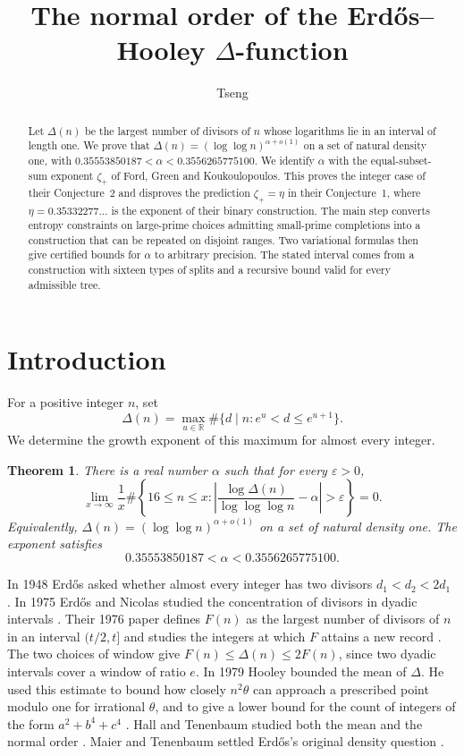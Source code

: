 \documentclass[11pt]{article}
\title{The normal order of the Erd\H{o}s--Hooley $\Delta$-function}
\author{Tseng}
\date{}
\newtheorem{theorem}{Theorem}[section]
\numberwithin{equation}{section}
\begin{document}
\maketitle

\begin{abstract}
Let $\Delta(n)$ be the largest number of divisors of $n$ whose
logarithms lie in an interval of length one. We prove that
$\Delta(n)=(\log\log n)^{\alpha+o(1)}$ on a set of natural density
one, with $0.35553850187<\alpha<0.3556265775100$. We identify
$\alpha$ with the equal-subset-sum exponent $\zeta_+$ of Ford, Green
and Koukoulopoulos. This proves the integer case of their Conjecture~2
and disproves the prediction $\zeta_+=\eta$ in their Conjecture~1,
where $\eta=0.35332277\ldots$ is the exponent of their binary
construction. The main step converts entropy constraints on
large-prime choices admitting small-prime completions into a
construction that can be repeated on disjoint ranges. Two variational formulas then give certified
bounds for $\alpha$ to arbitrary precision. The stated interval comes
from a construction with sixteen types of splits and a recursive
bound valid for every admissible tree.
\end{abstract}

\section{Introduction}\label{s:intro}

For a positive integer $n$, set
\[
 \Delta(n)=\max_{u\in\mathbb R}\#\{d\mid n:e^u<d\le e^{u+1}\}.
\]
We determine the growth exponent of this maximum for almost every
integer.

\begin{theorem}\label{t:main}
There is a real number $\alpha$ such that for every $\varepsilon>0$,
\[
 \lim_{x\to\infty}\frac1x\#\left\{16\le n\le x:
 \left|\frac{\log\Delta(n)}{\log\log\log n}-\alpha\right|
 >\varepsilon\right\}=0 .
\]
Equivalently, $\Delta(n)=(\log\log n)^{\alpha+o(1)}$ on a set of
natural density one. The exponent satisfies
\begin{equation}
             0.35553850187<\alpha<0.3556265775100 .
             \label{e:decimal}
\end{equation}
\end{theorem}

In 1948 Erd\H{o}s asked whether almost every integer has two
divisors $d_1<d_2<2d_1$ \cite{erdos}. In 1975
Erd\H{o}s and Nicolas studied the concentration of divisors in
dyadic intervals \cite{en75}. Their 1976 paper defines $F(n)$ as the
largest number of divisors of $n$ in an interval $(t/2,t]$ and studies
the integers at which $F$ attains a new record \cite{en76}. The two choices of
window give $F(n)\le\Delta(n)\le2F(n)$, since two dyadic intervals
cover a window of ratio $e$. In 1979 Hooley bounded the mean of
$\Delta$. He used this estimate to bound how closely $n^2\theta$
can approach a prescribed point modulo one for irrational $\theta$,
and to give a lower bound for the count of integers of the form
$a^2+b^4+c^4$ \cite[Theorems~4--5]{hooley}. Hall and Tenenbaum
studied both the mean and the normal order \cite{ht}.
Maier and Tenenbaum settled Erd\H{o}s's original density question
\cite{mt84}.
\end{document}
